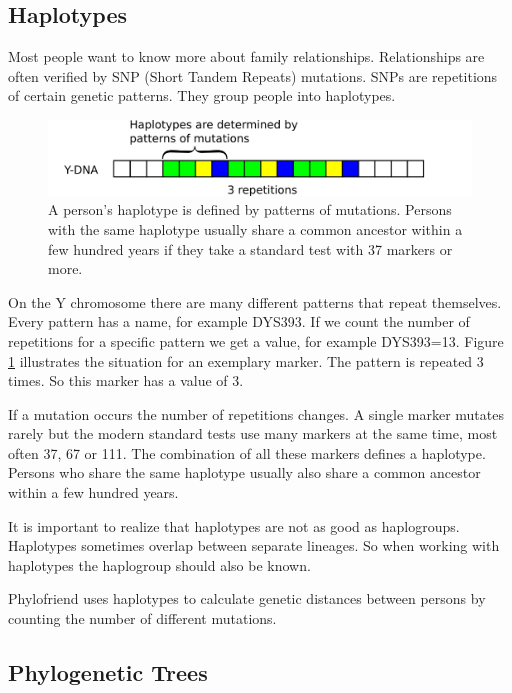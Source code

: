 \subsection{Haplotypes}

Most people want to know more about family relationships.
Relationships are often verified by SNP (Short Tandem
Repeats) mutations. SNPs are repetitions of certain
genetic patterns. They group people into haplotypes.

\begin{figure}[ht]
\centering
\includegraphics[width=13cm]{img/haplotypes.png}
\caption{\label{haplotype} A person's haplotype is defined
by patterns of mutations. Persons with the same haplotype
usually share a common ancestor within a few hundred years
if they take a standard test with 37 markers or more.}
\end{figure}

On the Y chromosome there are many different patterns that
repeat themselves. Every pattern has a name, for example DYS393.
If we count the number of repetitions for a specific pattern
we get a value, for example DYS393=13. Figure \ref{haplotype}
illustrates the situation for an exemplary marker. The pattern
is repeated 3 times. So this marker has a value of 3.

If a mutation occurs the number of repetitions changes. A 
single marker mutates rarely but the modern standard tests
use many markers at the same time, most often 37, 67 or
111. The combination of all these markers defines
a haplotype. Persons who share the same haplotype usually
also share a common ancestor within a few hundred years.

It is important to realize that haplotypes are not as good
as haplogroups. Haplotypes sometimes overlap between separate
lineages. So when working with haplotypes the haplogroup
should also be known.

Phylofriend uses haplotypes to calculate genetic distances
between persons by counting the number of different mutations.


\subsection{Phylogenetic Trees}

